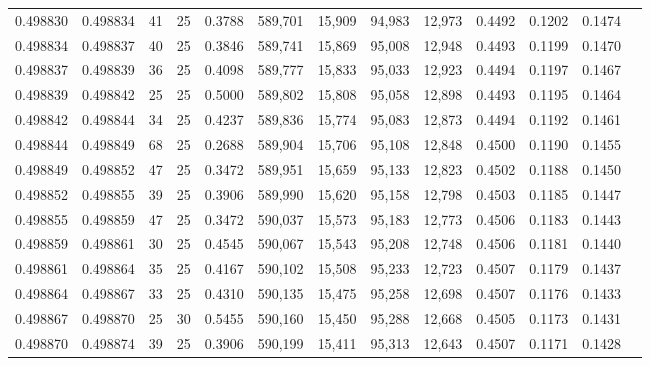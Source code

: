 \begin{tabular}{rrrrrrrrrrrrr}
0.498830 & 0.498834 &    41 &  25 &                                     0.3788 & 589,701 &  15,909 &  94,983 &  12,973 & 0.4492 & 0.1202 & 0.1474 \\
0.498834 & 0.498837 &    40 &  25 &                                     0.3846 & 589,741 &  15,869 &  95,008 &  12,948 & 0.4493 & 0.1199 & 0.1470 \\
0.498837 & 0.498839 &    36 &  25 &                                     0.4098 & 589,777 &  15,833 &  95,033 &  12,923 & 0.4494 & 0.1197 & 0.1467 \\
0.498839 & 0.498842 &    25 &  25 &                                     0.5000 & 589,802 &  15,808 &  95,058 &  12,898 & 0.4493 & 0.1195 & 0.1464 \\
0.498842 & 0.498844 &    34 &  25 &                                     0.4237 & 589,836 &  15,774 &  95,083 &  12,873 & 0.4494 & 0.1192 & 0.1461 \\
0.498844 & 0.498849 &    68 &  25 &                                     0.2688 & 589,904 &  15,706 &  95,108 &  12,848 & 0.4500 & 0.1190 & 0.1455 \\
0.498849 & 0.498852 &    47 &  25 &                                     0.3472 & 589,951 &  15,659 &  95,133 &  12,823 & 0.4502 & 0.1188 & 0.1450 \\
0.498852 & 0.498855 &    39 &  25 &                                     0.3906 & 589,990 &  15,620 &  95,158 &  12,798 & 0.4503 & 0.1185 & 0.1447 \\
0.498855 & 0.498859 &    47 &  25 &                                     0.3472 & 590,037 &  15,573 &  95,183 &  12,773 & 0.4506 & 0.1183 & 0.1443 \\
0.498859 & 0.498861 &    30 &  25 &                                     0.4545 & 590,067 &  15,543 &  95,208 &  12,748 & 0.4506 & 0.1181 & 0.1440 \\
0.498861 & 0.498864 &    35 &  25 &                                     0.4167 & 590,102 &  15,508 &  95,233 &  12,723 & 0.4507 & 0.1179 & 0.1437 \\
0.498864 & 0.498867 &    33 &  25 &                                     0.4310 & 590,135 &  15,475 &  95,258 &  12,698 & 0.4507 & 0.1176 & 0.1433 \\
0.498867 & 0.498870 &    25 &  30 &                                     0.5455 & 590,160 &  15,450 &  95,288 &  12,668 & 0.4505 & 0.1173 & 0.1431 \\
0.498870 & 0.498874 &    39 &  25 &                                     0.3906 & 590,199 &  15,411 &  95,313 &  12,643 & 0.4507 & 0.1171 & 0.1428 \\

\end{tabular}
